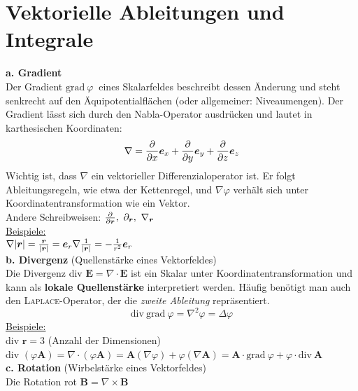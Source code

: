 \section{Vektorielle Ableitungen und Integrale}
\textbf{a. Gradient}\\
\linebreak
Der Gradient $\mathrm{grad\ }\varphi\ $ eines Skalarfeldes beschreibt dessen Änderung und steht senkrecht auf den Äquipotentialflächen (oder allgemeiner: Niveaumengen). Der Gradient lässt sich durch den Nabla-Operator ausdrücken und lautet in karthesischen Koordinaten: 
\begin{equation*}
\nabla=\frac{\partial{}}{\partial{x}}\bm{e}_x+\frac{\partial{}}{\partial{y}}\bm{e}_y+\frac{\partial{}}{\partial{z}}\bm{e}_z
\end{equation*}
Wichtig ist, dass $\nabla$ ein vektorieller Differenzialoperator ist. Er folgt Ableitungsregeln, wie etwa der Kettenregel, und $\nabla\varphi$ verhält sich unter Koordinatentransformation wie ein Vektor.\\
\linebreak
Andere Schreibweisen: $\pdiff{}{\bm{r}},\ \partial_{\bm{r}},\ \nabla_{\bm{r}}$\\
\linebreak
\underline{Beispiele:}\\
\linebreak
$\nabla |\bm{r}|=\frac{\bm{r}}{|\bm{r}|}=\bm{e}_r\\
\nabla \frac{1}{|\bm{r}|}=-\frac{1}{r^2}\bm{e}_r$\\
\linebreak\linebreak
\textbf{b. Divergenz} (Quellenstärke eines Vektorfeldes)\\
\linebreak
Die Divergenz div $\bm{E}=\nabla\cdot\bm{E}$ ist ein Skalar unter Koordinatentransformation und kann als \textbf{lokale Quellenstärke} interpretiert werden. Häufig benötigt man auch den \textsc{Laplace}-Operator, der die \emph{zweite Ableitung} repräsentiert.\\
\begin{equation*}
\mathrm{div\ grad\ } \varphi=\nabla^2\varphi=\Delta\varphi
\end{equation*}
\underline{Beispiele:}\\
\linebreak
div $\bm{r}=3$ (Anzahl der Dimensionen)\\
div $(\varphi\bm{A})=\nabla\cdot(\varphi\bm{A})=\bm{A}(\nabla\varphi)+\varphi(\nabla\bm{A})=\bm{A}\cdot\mathrm{grad\ }\varphi+\varphi\cdot\mathrm{div\ }\bm{A}$\\
\linebreak
\textbf{c. Rotation} (Wirbelstärke eines Vektorfeldes)\\
\linebreak
Die Rotation rot $\bm{B}=\nabla\times\bm{B}$

